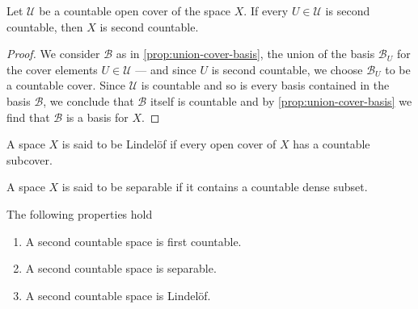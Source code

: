 \begin{corollary}
\label{cor:second-countable-out-of-cover}
Let \(\mathcal U\) be a countable open cover of the space \(X\). If every \(U
\in \mathcal U\) is second countable, then \(X\) is second countable.
\end{corollary}

\begin{proof}
We consider \(\mathcal B\) as in \cref{prop:union-cover-basis}, the union of the
basis \(\mathcal B_U\) for the cover elements \(U \in \mathcal U\) --- and since
\(U\) is second countable, we choose \(\mathcal B_U\) to be a countable
cover. Since \(\mathcal U\) is countable and so is every basis contained in the
basis \(\mathcal B\), we conclude that \(\mathcal B\) itself is countable and by
\cref{prop:union-cover-basis} we find that \(\mathcal B\) is a basis for \(X\).
\end{proof}

\begin{definition}
A space \(X\) is said to be Lindelöf if every open cover of \(X\) has a
countable subcover.
\end{definition}

\begin{definition}
A space \(X\) is said to be separable if it contains a countable dense subset.
\end{definition}

\begin{proposition}
\label{prop: second countable properties}
The following properties hold
\begin{enumerate}[(SC1)]
  \item A second countable space is first countable.
  \item A second countable space is separable.
  \item A second countable space is Lindelöf.
\end{enumerate}
\end{proposition}

